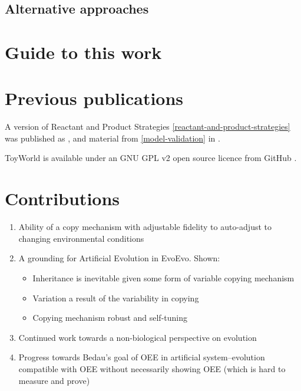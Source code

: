 \subsection{Alternative approaches}

\section{Guide to this work}\label{guide-to-this-work}

\section{Previous publications}\label{previous-publications}

A version of Reactant and Product Strategies \cref{reactant-and-product-strategies} was published as \cite{Young2015},
and material from \cref{model-validation} in \cite{Young2013}.

ToyWorld is available under an GNU GPL v2 open source licence from GitHub \cite{toyworld}.

\section{Contributions}\label{contributions}

\begin{enumerate}
	\item Ability of a copy mechanism with adjustable fidelity to auto-adjust to changing environmental conditions
	\item A grounding for Artificial Evolution in EvoEvo. Shown:
	      \begin{itemize}
	      	\item Inheritance is inevitable given some form of variable copying mechanism
	      	\item Variation a result of the variability in copying
	      	\item Copying mechanism robust and self-tuning
	      \end{itemize}
	\item Continued work towards a non-biological perspective on evolution
	\item Progress towards Bedau's goal of OEE in artificial system--evolution compatible with OEE without necessarily showing OEE (which is hard to measure and prove)
\end{enumerate}